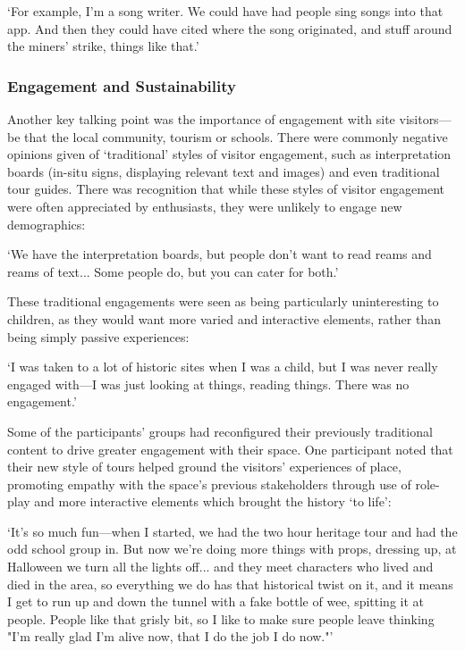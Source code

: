 \begin{displayquote}
`For example, I'm a song writer. We could have had people sing songs into that app. And then they could have cited where the song originated, and stuff around the miners' strike, things like that.'
\end{displayquote}

\subsubsection{Engagement and Sustainability}

Another key talking point was the importance of engagement with site visitors---be that the local community, tourism or schools. There were commonly negative opinions given of `traditional' styles of visitor engagement, such as interpretation boards (in-situ signs, displaying relevant text and images) and even traditional tour guides. There was recognition that while these styles of visitor engagement were often appreciated by enthusiasts, they were unlikely to engage new demographics:

\begin{displayquote}
`We have the interpretation boards, but people don't want to read reams and reams of text... Some people do, but you can cater for both.'
\end{displayquote}

These traditional engagements were seen as being particularly uninteresting to children, as they would want more varied and interactive elements, rather than being simply passive experiences:

\begin{displayquote}
`I was taken to a lot of historic sites when I was a child, but I was never really engaged with---I was just looking at things, reading things. There was no engagement.'
\end{displayquote}

Some of the participants' groups had reconfigured their previously traditional content to drive greater engagement with their space. One participant noted that their new style of tours helped ground the visitors' experiences of place, promoting empathy with the space's previous stakeholders through use of role-play and more interactive elements which brought the history `to life':

\begin{displayquote}
`It's so much fun---when I started, we had the two hour heritage tour and had the odd school group in. But now we're doing more things with props, dressing up, at Halloween we turn all the lights off... and they meet characters who lived and died in the area, so everything we do has that historical twist on it, and it means I get to run up and down the tunnel with a fake bottle of wee, spitting it at people. People like that grisly bit, so I like to make sure people leave thinking "I'm really glad I'm alive now, that I do the job I do now."'
\end{displayquote}

